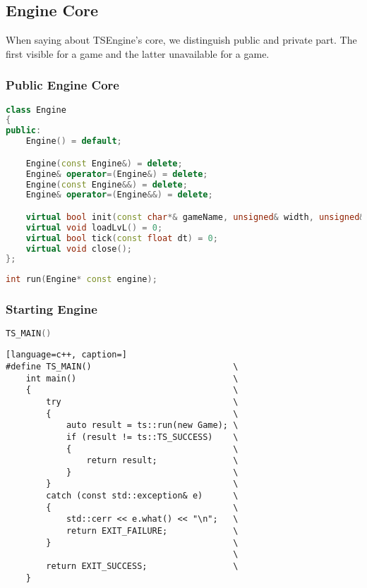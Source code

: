 \newpage
\subsection{Engine Core}
\label{sec:engine_core}
When saying about TSEngine's core, we distinguish public and private part. The first visible for a game and the latter unavailable for a game.
\subsubsection{Public Engine Core}
\label{sec:engine_class}
\begin{lstlisting}[language=c++, caption=Engine class (./engine/include/tsengine/core.h)]
class Engine
{
public:
    Engine() = default;

    Engine(const Engine&) = delete;
    Engine& operator=(Engine&) = delete;
    Engine(const Engine&&) = delete;
    Engine& operator=(Engine&&) = delete;

    virtual bool init(const char*& gameName, unsigned& width, unsigned& height);
    virtual void loadLvL() = 0;
    virtual bool tick(const float dt) = 0;
    virtual void close();
};
\end{lstlisting}

\label{sec:run_fun}
\begin{lstlisting}[language=c++, caption=Run function (./engine/include/tsengine/core.h)]
int run(Engine* const engine);
\end{lstlisting}

\newpage

\subsubsection{Starting Engine}
\begin{lstlisting}[language=c++, caption=Start of the Example Game (./game/game.cpp)]
TS_MAIN()
\end{lstlisting}

\begin{lstlisting}[language=c++, caption=]
#define TS_MAIN()                            \
    int main()                               \
    {                                        \
        try                                  \
        {                                    \
            auto result = ts::run(new Game); \
            if (result != ts::TS_SUCCESS)    \
            {                                \
                return result;               \
            }                                \
        }                                    \
        catch (const std::exception& e)      \
        {                                    \
            std::cerr << e.what() << "\n";   \
            return EXIT_FAILURE;             \
        }                                    \
                                             \
        return EXIT_SUCCESS;                 \
    }
\end{lstlisting}


